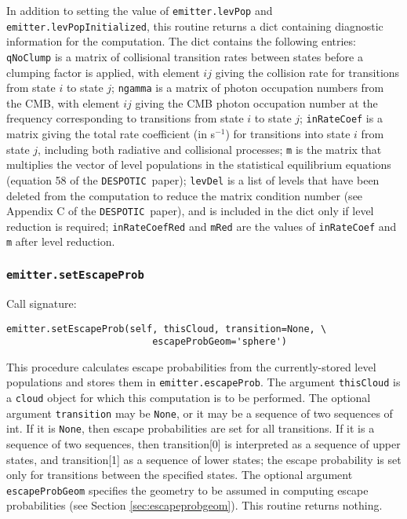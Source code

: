 \documentclass[12pt]{article}
\newcommand{\despotic}{\texttt{DESPOTIC}}
\begin{document}
In addition to setting the value of \verb=emitter.levPop= and \verb=emitter.levPopInitialized=, this routine returns a dict containing diagnostic information for the computation. The dict contains the following entries: \verb=qNoClump= is a matrix of collisional transition rates between states before a clumping factor is applied, with element $ij$ giving the collision rate for transitions from state $i$ to state $j$; \verb=ngamma= is a matrix of photon occupation numbers from the CMB, with element $ij$ giving the CMB photon occupation number at the frequency corresponding to transitions from state $i$ to state $j$; \verb=inRateCoef= is a matrix giving the total rate coefficient (in s$^{-1}$) for transitions into state $i$ from state $j$, including both radiative and collisional processes; \verb=m= is the matrix that multiplies the vector of level populations in the statistical equilibrium equations (equation 58 of the \despotic\ paper); \verb=levDel= is a list of levels that have been deleted from the computation to reduce the matrix condition number (see Appendix C of the \despotic\ paper), and is included in the dict only if level reduction is required; \verb=inRateCoefRed= and \verb=mRed= are the values of \verb=inRateCoef= and \verb=m= after level reduction.

\subsubsection{\texttt{emitter.setEscapeProb}}

Call signature:

\begin{verbatim}
emitter.setEscapeProb(self, thisCloud, transition=None, \
                          escapeProbGeom='sphere')
\end{verbatim}

This procedure calculates escape probabilities from the currently-stored level populations and stores them in \verb=emitter.escapeProb=. The argument \verb=thisCloud= is a \verb=cloud= object for which this computation is to be performed. The optional argument \verb=transition= may be \verb=None=, or it may be a sequence of two sequences of int. If it is \verb=None=, then escape probabilities are set for all transitions. If it is a sequence of two sequences, then transition[0] is interpreted as a sequence of upper states, and transition[1] as a sequence of lower states; the escape probability is set only for transitions between the specified states. The optional argument \verb=escapeProbGeom= specifies the geometry to be assumed in computing escape probabilities (see Section \ref{sec:escapeprobgeom}). This routine returns nothing.
\end{document}
